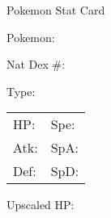 \documentclass{article}
\begin{document}
Pokemon Stat Card

Pokemon:

Nat Dex \#:

Type:

\begin{tabular}{|l|l|}
HP: & Spe: \\
Atk: & SpA: \\
Def: & SpD: \\
\end{tabular}

Upscaled HP:
\end{document}
